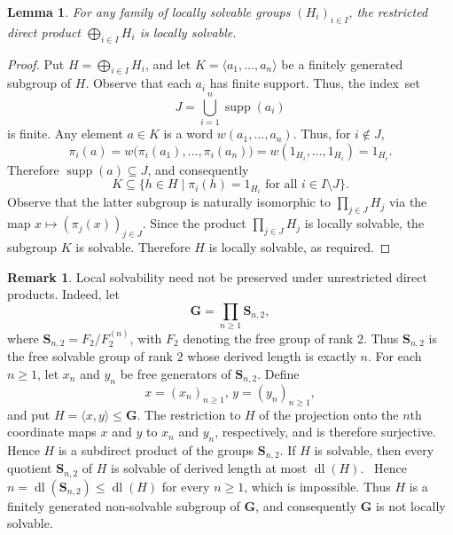 \documentclass[11pt, reqno]{amsart}
\numberwithin{equation}{section}
\newtheorem{lemma}[theorem]{Lemma}
\theoremstyle{definition}
\newtheorem{Remark}[theorem]{Remark}
\numberwithin{equation}{section}
\begin{document}
\begin{lemma}\label{lem:restricteddirectproductlocsolislocsol}
    For any family of locally solvable groups $(H_i)_{i \in I}$, the restricted direct product $\bigoplus_{i \in I} H_i$ is locally solvable.        
\end{lemma}

\begin{proof}
Put $ H = \bigoplus_{i\in I} H_i $, and let $ K = \langle a_1, \dots, a_n \rangle $ be a finitely generated subgroup of $ H $. Observe that each $ a_i $ has finite support. Thus, the index~set $$J = \bigcup_{i=1}^n \operatorname{supp}(a_i)$$ is  finite. Any element $a \in K$ is a word $w(a_1, \dots, a_n)$. Thus, for $i \notin J$,
$$
\pi_i(a) = w\bigl(\pi_i(a_1), \dots, \pi_i(a_n)\bigr) = w(1_{H_i}, \dots, 1_{H_i}) = 1_{H_i}.
$$
Therefore $\operatorname{supp}(a) \subseteq J$, and consequently 
$$K \subseteq \bigl\{h \in H \mid \pi_i(h)=1_{H_i}  \text{ for all } i \in I \setminus J \bigr\}.$$
Observe that the latter subgroup is naturally isomorphic to $ \prod_{j \in J} H_j $ via the map $x \mapsto(\pi_j(x))_{j \in J}.$ Since the product $\prod_{j \in J} H_j$ is locally solvable, the subgroup $K$ is solvable. Therefore $H$ is locally solvable, as required.
\end{proof}

\begin{Remark}
Local solvability need not be preserved under unrestricted direct products.
Indeed, let
$$\mathbf G=\prod_{n\geq 1}\mathbf S_{n,2},$$
where $\mathbf S_{n,2}=F_2/F_2^{(n)}$, with $F_2$ denoting the free group of
rank $2$. Thus $\mathbf S_{n,2}$ is the free solvable group of rank $2$ whose
derived length is exactly $n$.  For each $n\geq 1$, let $x_n$ and $y_n$ be free generators of
$\mathbf S_{n,2}$. Define
$$x=(x_n)_{n\geq 1},
\,
y=(y_n)_{n\geq 1},$$
and put $H=\langle x,y\rangle\leq \mathbf G.$ The restriction to $H$ of the projection onto the $n$th coordinate maps
$x$ and $y$ to $x_n$ and $y_n$, respectively, and is therefore surjective.
Hence $H$ is a subdirect product of the groups $\mathbf S_{n,2}$.
If $H$ is solvable, then every quotient $\mathbf S_{n,2}$ of $H$ is
solvable of derived length at most $\operatorname{dl}(H)$.  ~Hence
$n=\operatorname{dl}(\mathbf S_{n,2})
\leq \operatorname{dl}(H)$
for every $n\geq 1$, which is impossible.  Thus $H$ is a finitely generated
non-solvable subgroup of $\mathbf G$, and consequently $\mathbf G$ is not
locally solvable.
\end{Remark}
\end{document}
